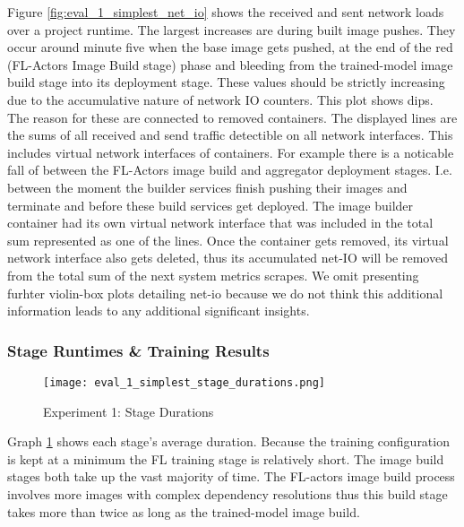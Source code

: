 Figure \ref{fig:eval_1_simplest_net_io} shows the received and sent network loads over a project runtime.
The largest increases are during built image pushes.
They occur around minute five when the base image gets pushed, at the end of the red (FL-Actors Image Build stage) phase and bleeding from the trained-model image build stage into its deployment stage.
These values should be strictly increasing due to the accumulative nature of network IO counters.
This plot shows dips.
The reason for these are connected to removed containers.
The displayed lines are the sums of all received and send traffic detectible on all network interfaces.
This includes virtual network interfaces of containers.
For example there is a noticable fall of between the FL-Actors image build and aggregator deployment stages.
I.e. between the moment the builder services finish pushing their images and terminate and before these build services get deployed.
The image builder container had its own virtual network interface that was included in the total sum represented as one of the lines.
Once the container gets removed, its virtual network interface also gets deleted, thus its accumulated net-IO will be removed from the total sum of the next system metrics scrapes.
We omit presenting furhter violin-box plots detailing net-io because we do not think this additional information leads to any additional significant insights.

\subsubsection{Stage Runtimes \& Training Results}

\begin{figure}[h]
    \begin{adjustwidth}{-0.2\paperwidth}{-0.2\paperwidth}
        \centering
        \texttt{[image: eval\_1\_simplest\_stage\_durations.png]}
        \caption{Experiment 1: Stage Durations}
        \label{fig:eval_1_simplest_stage_durations}
    \end{adjustwidth}
\end{figure}

Graph \ref{fig:eval_1_simplest_stage_durations} shows each stage's average duration.
Because the training configuration is kept at a minimum the FL training stage is relatively short.
The image build stages both take up the vast majority of time.
The FL-actors image build process involves more images with complex dependency resolutions thus this build stage takes more than twice as long as the trained-model image build.

